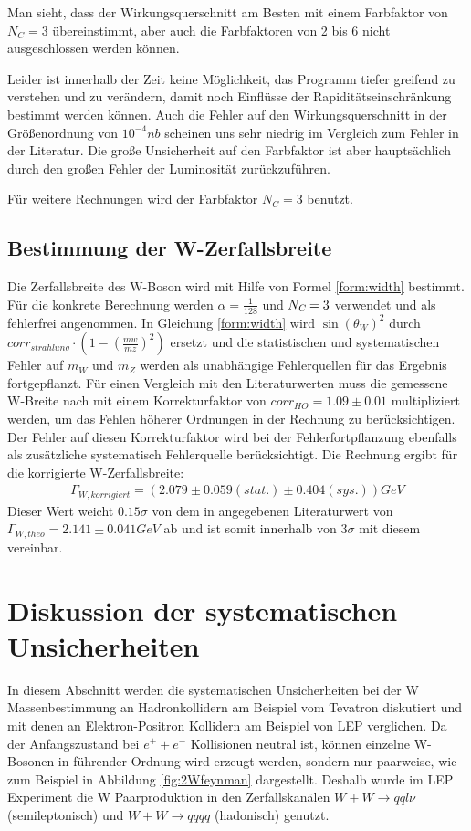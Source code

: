 \documentclass[a4paper,12pt]{article}
\begin{document}
Man sieht, dass der Wirkungsquerschnitt am Besten mit einem Farbfaktor von $N_C = 3$ übereinstimmt,
aber auch die Farbfaktoren von 2 bis 6 nicht ausgeschlossen werden können.

Leider ist innerhalb der Zeit keine Möglichkeit, das Programm tiefer greifend zu verstehen und zu
verändern, damit noch Einflüsse der Rapiditätseinschränkung bestimmt werden können. Auch die Fehler
auf den Wirkungsquerschnitt in der Größenordnung von $10^{-4}\si{nb}$ scheinen uns sehr niedrig im
Vergleich zum Fehler in der Literatur.
Die große Unsicherheit auf den Farbfaktor ist aber hauptsächlich durch den großen Fehler der
Luminosität zurückzuführen.

Für weitere Rechnungen wird der Farbfaktor $N_C = 3$ benutzt.

\subsection{Bestimmung der W-Zerfallsbreite}
Die Zerfallsbreite des W-Boson wird mit Hilfe von Formel \ref{form:width} bestimmt. Für die konkrete Berechnung
werden $\alpha = \frac{1}{128}$ und $N_{\textsl{C}}=3$ verwendet und als fehlerfrei angenommen. In Gleichung \ref{form:width}
wird $\sin(\theta_{W})^{2} $
 durch $corr_{strahlung}\cdot(1-(\frac{mw}{mz})^{2})$ ersetzt und die statistischen und
systematischen Fehler auf $m_{W}$ und $m_{Z}$ werden als unabhängige Fehlerquellen für das Ergebnis fortgepflanzt. Für 
einen Vergleich mit den Literaturwerten muss die gemessene W-Breite nach \cite{versuchsanleitung} mit einem Korrekturfaktor
von $corr_{HO}=1.09 \pm 0.01$ multipliziert werden, um das Fehlen höherer Ordnungen in der Rechnung zu berücksichtigen. Der
Fehler auf diesen Korrekturfaktor wird bei der Fehlerfortpflanzung ebenfalls als zusätzliche systematisch Fehlerquelle
berücksichtigt. Die Rechnung ergibt für die korrigierte W-Zerfallsbreite:
\begin{align*}
	Γ_{W,korrigiert} = ( 2.079 ± 0.059 (stat.) ± 0.404(sys.)) \si{GeV}
\end{align*}
Dieser Wert weicht $0.15\sigma$ von dem in \cite{versuchsanleitung} angegebenen Literaturwert von
$Γ_{W,theo} = 2.141 \pm 0.041\si{GeV}$
ab und ist somit innerhalb von $3\sigma$ mit diesem vereinbar.

\newpage
\section{Diskussion der systematischen Unsicherheiten}
In diesem Abschnitt werden die systematischen Unsicherheiten bei der W Massenbestimmung an Hadronkollidern am Beispiel vom Tevatron diskutiert
und mit denen an Elektron-Positron Kollidern am Beispiel von LEP verglichen. Da der Anfangszustand bei $e^{+}+e^{-}$ Kollisionen neutral ist, können einzelne W-Bosonen
in führender Ordnung wird erzeugt werden, sondern nur paarweise, wie zum Beispiel in Abbildung \ref{fig:2Wfeynman} dargestellt. Deshalb wurde im LEP Experiment die W Paarproduktion in den \cite{Achard:2005qy}
Zerfallskanälen $W+W \rightarrow qql\nu$ (semileptonisch) und $W+W \rightarrow qqqq$ (hadonisch) genutzt.
\end{document}
